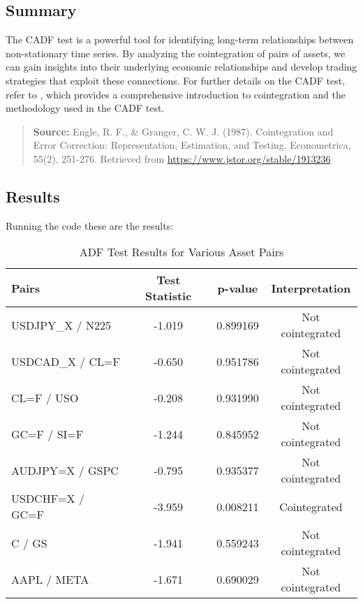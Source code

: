 \documentclass{article}
\begin{document}
\subsection{Summary}
The CADF test is a powerful tool for identifying long-term relationships between non-stationary time series. By analyzing the cointegration of pairs of assets, we can gain insights into their underlying economic relationships and develop trading strategies that exploit these connections.
For further details on the CADF test, refer to \textcite{engle1987cointegration}, which provides a comprehensive introduction to cointegration and the methodology used in the CADF test.

\begin{quote}
\textbf{Source:} Engle, R. F., \& Granger, C. W. J. (1987). Cointegration and Error Correction: Representation, Estimation, and Testing. Econometrica, 55(2), 251-276. Retrieved from \url{https://www.jstor.org/stable/1913236}
\end{quote}

\subsection*{Results}
Running the code these are the results:

\begin{table}[h!]
    \centering
    \begin{tabular}{|l|c|c|c|}
        \hline
        \textbf{Pairs} & \textbf{Test Statistic} & \textbf{p-value} & \textbf{Interpretation} \\
        \hline
        USDJPY\_X / N225 & -1.019 & 0.899169 & Not cointegrated \\
        \hline
        USDCAD\_X / CL=F & -0.650 & 0.951786 & Not cointegrated \\
        \hline
        CL=F / USO & -0.208 & 0.931990 & Not cointegrated \\
        \hline
        GC=F / SI=F & -1.244 & 0.845952 & Not cointegrated \\
        \hline
        AUDJPY=X / GSPC & -0.795 & 0.935377 & Not cointegrated \\
        \hline
        USDCHF=X / GC=F & -3.959 & 0.008211 & Cointegrated \\
        \hline
        C / GS & -1.941 & 0.559243 & Not cointegrated \\
        \hline
        AAPL / META & -1.671 & 0.690029 & Not cointegrated \\
        \hline
    \end{tabular}
    \caption{ADF Test Results for Various Asset Pairs}
    \label{tab:adf_results}
\end{table}
\end{document}
